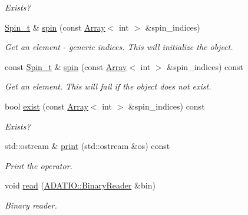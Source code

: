 \begin{DoxyCompactItemize}
\begin{DoxyCompactList}\small\item\em Exists? \end{DoxyCompactList}\item 
\mbox{\hyperlink{structHadron_1_1HadronDistOperatorRep__t_1_1Spin__t}{Spin\+\_\+t}} \& \mbox{\hyperlink{classHadron_1_1HadronDistOperatorRep__t_ad889e6377702e72419f259860142225f}{spin}} (const \mbox{\hyperlink{classXMLArray_1_1Array}{Array}}$<$ int $>$ \&spin\+\_\+indices)
\begin{DoxyCompactList}\small\item\em Get an element -\/ generic indices. This will initialize the object. \end{DoxyCompactList}\item 
const \mbox{\hyperlink{structHadron_1_1HadronDistOperatorRep__t_1_1Spin__t}{Spin\+\_\+t}} \& \mbox{\hyperlink{classHadron_1_1HadronDistOperatorRep__t_afdc4b290b39dd14deb08a54cec303f5f}{spin}} (const \mbox{\hyperlink{classXMLArray_1_1Array}{Array}}$<$ int $>$ \&spin\+\_\+indices) const
\begin{DoxyCompactList}\small\item\em Get an element. This will fail if the object does not exist. \end{DoxyCompactList}\item 
bool \mbox{\hyperlink{classHadron_1_1HadronDistOperatorRep__t_aac19d4174b14052f09070df85c789d43}{exist}} (const \mbox{\hyperlink{classXMLArray_1_1Array}{Array}}$<$ int $>$ \&spin\+\_\+indices) const
\begin{DoxyCompactList}\small\item\em Exists? \end{DoxyCompactList}\item 
std\+::ostream \& \mbox{\hyperlink{classHadron_1_1HadronDistOperatorRep__t_a800e1844116007d2ca372628f2388ee5}{print}} (std\+::ostream \&os) const
\begin{DoxyCompactList}\small\item\em Print the operator. \end{DoxyCompactList}\item 
void \mbox{\hyperlink{classHadron_1_1HadronDistOperatorRep__t_a17387b2569f243bf0aecc9c6f4160051}{read}} (\mbox{\hyperlink{classADATIO_1_1BinaryReader}{A\+D\+A\+T\+I\+O\+::\+Binary\+Reader}} \&bin)
\begin{DoxyCompactList}\small\item\em Binary reader. \end{DoxyCompactList}\item 

\end{DoxyCompactItemize}
